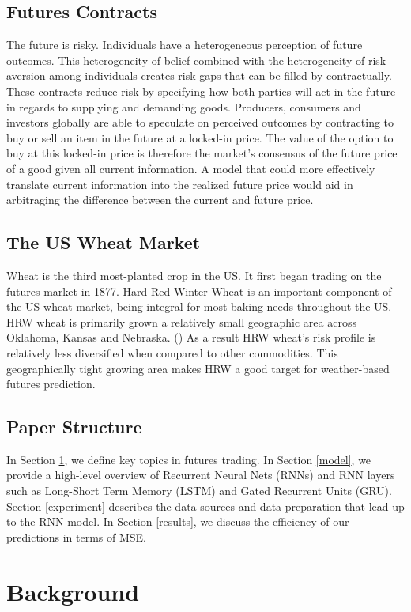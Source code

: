 \documentclass[twoside,11pt]{article}
\begin{document}
\subsection{Futures Contracts}
The future is risky. Individuals have a heterogeneous perception of future outcomes. This heterogeneity of belief combined with the heterogeneity of risk aversion among individuals creates risk gaps that can be filled by contractually. These contracts reduce risk by specifying how both parties will act in the future in regards to supplying and demanding goods. Producers, consumers and investors globally are able to speculate on perceived outcomes by contracting to buy or sell an item in the future at a locked-in price. The value of the option to buy at this locked-in price is therefore the market's consensus of the future price of a good given all current information. A model that could more effectively translate current information into the realized future price would aid in arbitraging the difference between the current and future price.

\subsection{The US Wheat Market}
Wheat is the third most-planted crop in the US. It first began trading on the futures market in 1877. Hard Red Winter Wheat is an important component of the US wheat market, being integral for most baking needs throughout the US. HRW wheat is primarily grown a relatively small geographic area across Oklahoma, Kansas and Nebraska. (\cite{CME}) As a result HRW wheat's risk profile is relatively less diversified when compared to other commodities. This geographically tight growing area makes HRW a good target for weather-based futures prediction. 

\subsection{Paper Structure}
In Section \ref{background}, we define key topics in futures trading. In Section \ref{model}, we provide a high-level overview of Recurrent Neural Nets (RNNs) and RNN layers such as Long-Short Term Memory (LSTM) and Gated Recurrent Units (GRU). Section \ref{experiment} describes the data sources and data preparation that lead up to the RNN model.  In Section \ref{results}, we discuss the efficiency of our predictions in terms of MSE. 

\section{Background} \label{background}
\end{document}
